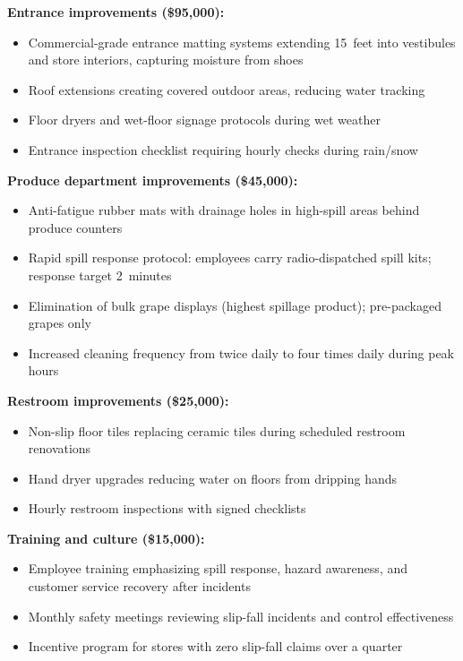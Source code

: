 \documentclass[11pt,openany]{book}
\providecommand{\tightlist}{\setlength{\itemsep}{0pt}\setlength{\parskip}{0pt}}
\begin{document}
\textbf{Entrance improvements (\$95{,}000):}
\begin{itemize}\tightlist
  \item Commercial-grade entrance matting systems extending 15~feet into
        vestibules and store interiors, capturing moisture from shoes
  \item Roof extensions creating covered outdoor areas, reducing water
        tracking
  \item Floor dryers and wet-floor signage protocols during wet weather
  \item Entrance inspection checklist requiring hourly checks during rain/snow
\end{itemize}

\textbf{Produce department improvements (\$45{,}000):}
\begin{itemize}\tightlist
  \item Anti-fatigue rubber mats with drainage holes in high-spill areas
        behind produce counters
  \item Rapid spill response protocol: employees carry radio-dispatched spill
        kits; response target 2~minutes
  \item Elimination of bulk grape displays (highest spillage product);
        pre-packaged grapes only
  \item Increased cleaning frequency from twice daily to four times daily
        during peak hours
\end{itemize}

\textbf{Restroom improvements (\$25{,}000):}
\begin{itemize}\tightlist
  \item Non-slip floor tiles replacing ceramic tiles during scheduled restroom
        renovations
  \item Hand dryer upgrades reducing water on floors from dripping hands
  \item Hourly restroom inspections with signed checklists
\end{itemize}

\textbf{Training and culture (\$15{,}000):}
\begin{itemize}\tightlist
  \item Employee training emphasizing spill response, hazard awareness, and
        customer service recovery after incidents
  \item Monthly safety meetings reviewing slip-fall incidents and control
        effectiveness
  \item Incentive program for stores with zero slip-fall claims over a quarter
\end{itemize}
\end{document}

